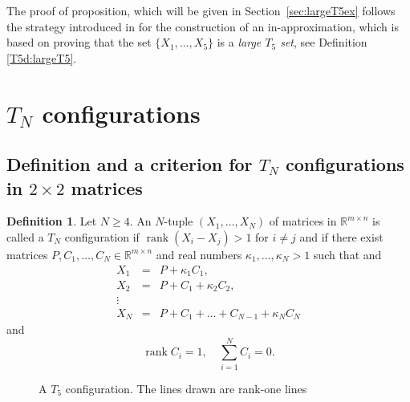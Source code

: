\documentclass[titlepage]{amsart}
\numberwithin{equation}{section}
\theoremstyle{plain}
\theoremstyle{definition}
\newtheorem{definition}[equation]{Definition}
\theoremstyle{remark}
\newcommand{\R}{\mathbb{R}}
\newcommand{\rank}{\operatorname{rank}}
\begin{document}
The proof of proposition, which will be given in   Section~\ref{sec:largeT5ex} follows 
 the strategy introduced in \cite{szekelyhidi_forster18} for the construction of an in-approximation, 
 which is based on proving that the set $\{X_1,\dots,X_5\}$ is a \emph{large $T_5$ set}, see Definition \ref{T5d:largeT5}.
 
 
\bigskip
\section{$T_N$ configurations}  \label{se:T4}

\subsection{Definition and a criterion for $T_N$ configurations in $2 \times 2$ matrices}


\begin{definition}  \label{de:T4}
Let $ N \ge 4$. An $N$-tuple $(X_1, \ldots,  X_N)$ of matrices in $\R^{m \times n}$ is called a $T_N$ configuration if 
$\rank(X_i - X_j ) > 1$ for $i \ne j$ and if there exist matrices $P,C_1, \ldots, C_N \in  \R^{m \times n}$
 and real numbers $\kappa_1,  \ldots, \kappa_N > 1$  such that
and
\begin{eqnarray*}
X_1 &=& P + \kappa_1 C_1, \\
X_2& =& P + C_1 + \kappa_2 C_2,\\
\vdots \\
X_N &=& P + C_1 +  \ldots  + C_{N-1} +  \kappa_N C_N
\end{eqnarray*}
and 
$$ \rank C_i = 1, \quad \sum_{i=1}^N C_i = 0.$$
\end{definition}




\begin{figure}
\caption{A $T_5$ configuration. The lines drawn are rank-one lines}
\end{figure}
\end{document}
